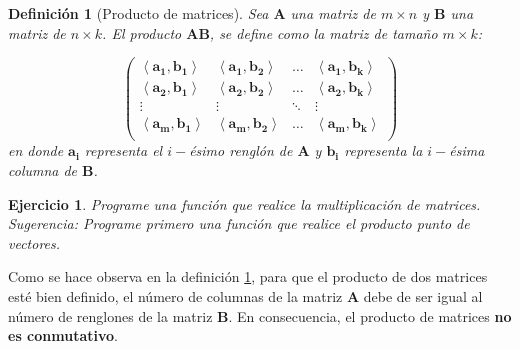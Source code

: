 \documentclass[11pt]{report}
\theoremstyle{break}
\newtheorem{definicion}{Definición}[chapter]
\newtheorem{ejercicio}{Ejercicio}[chapter]
\theoremstyle{break}
\newcommand{\matdim}[2]{$#1 \times #2$}
\begin{document}
\begin{definicion}[Producto de matrices]
\label{definicion:producto-matrices}
Sea $\bm{A}$ una matriz de \matdim{m}{n} y $\bm{B}$ una matriz de \matdim{n}{k}. El producto $\bm{A}\bm{B}$, se define como la matriz de tamaño \matdim{m}{k}:

$$
\begin{pmatrix}
\left< \bm{a_1}, \bm{b_1} \right> & \left< \bm{a_1}, \bm{b_2} \right> & \ldots & \left< \bm{a_1}, \bm{b_k} \right> \\
\left< \bm{a_2}, \bm{b_1} \right> & \left< \bm{a_2}, \bm{b_2} \right> & \ldots & \left< \bm{a_2}, \bm{b_k} \right> \\
\vdots & \vdots & \ddots & \vdots\\
\left< \bm{a_m}, \bm{b_1} \right> & \left< \bm{a_m}, \bm{b_2} \right> & \ldots & \left< \bm{a_m}, \bm{b_k} \right> \\
\end{pmatrix}
$$
en donde $\bm{a_i}$ representa el $i-$ésimo renglón de $\bm{A}$ y $\bm{b_i}$ representa la $i-$ésima columna de $\bm{B}$.
\end{definicion}

\begin{ejercicio}
Programe una función que realice la multiplicación de matrices. \newline
Sugerencia: Programe primero una función que realice el producto punto de vectores.
\end{ejercicio}

Como se hace observa en la definición \ref{definicion:producto-matrices}, para que el producto de dos matrices esté bien definido, el número de columnas de la matriz $\bm{A}$ debe de ser igual al número de renglones de la matriz $\bm{B}$. En consecuencia, el producto de matrices \textbf{no es conmutativo}.
\end{document}
